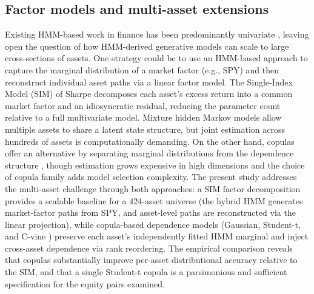 \subsection{Factor models and multi-asset extensions}
Existing HMM-based work in finance has been predominantly univariate \cite{hamilton_1989, rossi_volatility_2006, nguyen_hidden_2018, kim_nelson_1999}, leaving open the question of how HMM-derived generative models can scale to large cross-sections of assets. One strategy could be to use an HMM-based approach to capture the marginal distribution of a market factor (e.g., SPY) and then reconstruct individual asset paths via a linear factor model. The Single-Index Model (SIM) of Sharpe \cite{sharpe_simplified_1963} decomposes each asset's excess return into a common market factor and an idiosyncratic residual, reducing the parameter count relative to a full multivariate model. Mixture hidden Markov models \cite{dias_mixture_2010} allow multiple assets to share a latent state structure, but joint estimation across hundreds of assets is computationally demanding. On the other hand, copulas offer an alternative by separating marginal distributions from the dependence structure \cite{embrechts_copulas_2002, cherubini_copula_2004}, though estimation grows expensive in high dimensions and the choice of copula family adds model selection complexity. The present study addresses the multi-asset challenge through both approaches: a SIM factor decomposition provides a scalable baseline for a 424-asset universe (the hybrid HMM generates market-factor paths from SPY, and asset-level paths are reconstructed via the linear projection), while copula-based dependence models (Gaussian, Student-t, and C-vine \cite{aas_pair_2009}) preserve each asset's independently fitted HMM marginal and inject cross-asset dependence via rank reordering. The empirical comparison reveals that copulas substantially improve per-asset distributional accuracy relative to the SIM, and that a single Student-t copula is a parsimonious and sufficient specification for the equity pairs examined.
